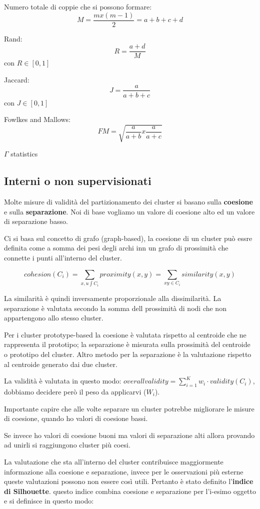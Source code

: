 Numero totale di coppie che si possono formare:
\[ M = \frac{m x (m-1)}{2} = a + b + c + d\]

Rand: \[R = \frac{a + d}{M}\] con $R \in [0,1]$

Jaccard: \[J = \frac{a}{a + b + c}\] con $J \in [0,1]$

Fowlkes and Mallows: \[FM = \sqrt{\frac{a}{a + b} x \frac{a}{a + c}}\]

$\Gamma$ statistics

\subsection{Interni o non supervisionati}

Molte misure di validit\`a del partizionamento dei cluster si basano sulla \textbf{coesione} e sulla \textbf{separazione}. Noi di base vogliamo un valore di coesione alto ed un valore di separazione basso.

Ci si basa sul concetto di grafo (graph-based), la coesione di un cluster pu\`o essre definita come a somma dei pesi degli archi inn un grafo di prossimit\`a che connette i punti all'interno del cluster. 

\[ cohesion(C_i) = \sum_{x, u \int C_i} proximity(x,y) = \sum_{x y \in C_i} similarity(x,y)\]

La similarit\`a \`e quindi inversamente proporzionale alla dissimilarit\`a. 
La separazione \`e valutata secondo la somma dell prossimit\`a di nodi che non appartengono allo stesso cluster.

Per i cluster prototype-based la coesione \`e valutata rispetto al centroide che ne rappresenta il prototipo; la separazione \`e misurata sulla prossimit\`a del centroide o prototipo del cluster. Altro metodo per la separazione \`e la valutazione rispetto al centroide generato dai due cluster.

La validit\`a \`e valutata in questo modo: $overall validity = \sum_{i = 1}^{K} w_i \cdot validity(C_i)$, dobbiamo decidere per\`o il peso da applicarvi ($W_i$). 


Importante capire che alle volte separare un cluster potrebbe migliorare le misure di coesione, quando ho valori di coesione bassi.

Se invece ho valori di coesione buoni ma valori di separazione alti allora provando ad unirli si raggiungono cluster pi\`u coesi. 

La valutazione che sta all'interno del cluster contribuisce maggiormente informazione alla coesione e separazione, invece per le osservazioni pi\`u esterne queste valutazioni possono non essere cos\`i utili. Pertanto \`e stato definito l'\textbf{indice di Silhouette}. questo indice combina coesione e separazione per l'i-esimo oggetto e si definisce in questo modo:

